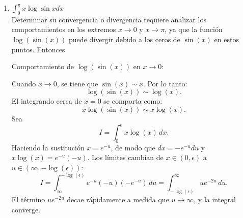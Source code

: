 \documentclass{article}
\begin{document}
\begin{enumerate}
\begin{enumerate}
Cuando \( x \to 0 \), el término \( \sin^2(x) \sim x^2 \) porque \( \sin(x) \approx x \). El denominador se aproxima a:
\[
1 + x^\beta x^2 = 1 + x^{\beta + 2}.
\]
Por lo tanto, el integrando tiene el siguiente comportamiento:
\[
\frac{x^\alpha}{1 + x^\beta \sin^2(x)} \sim \frac{x^\alpha}{1 + x^{\beta + 2}}.
\]
Para valores muy pequeños de \( x \), el término \( 1 + x^{\beta + 2} \sim 1 \), lo que lleva a:
\[
\frac{x^\alpha}{1 + x^{\beta + 2}} \sim x^\alpha.
\]
La integral en \( x \to 0 \) converge si \( \alpha > -1 \), ya que:
\[
\int_{0}^{\epsilon} x^\alpha \, dx = \frac{x^{\alpha + 1}}{\alpha + 1} \bigg|_0^\epsilon
\]
es finita si \( \alpha + 1 > 0 \).

Comportamiento en \( x \to \infty \):

Para \( x \to \infty \), el término \( x^\beta \sin^2(x) \) oscila entre \( 0 \) y \( x^\beta \), lo que implica que el denominador \( 1 + x^\beta \sin^2(x) \) oscila entre \( 1 \) y \( 1 + x^\beta \).

Estimación asintótica:

Cuando \( x \) es grande, aproximamos el integrando como:
\[
\frac{x^\alpha}{1 + x^\beta \sin^2(x)} \sim \frac{x^\alpha}{x^\beta}.
\]
Esto se reduce a:
\[
\frac{x^\alpha}{1 + x^\beta \sin^2(x)} \sim x^{\alpha - \beta}.
\]
La integral impropia:
\[
\int_{1}^{\infty} x^{\alpha - \beta} \, dx
\]
converge si \( \alpha - \beta < -1 \). En caso contrario, la integral diverge.

		\item $ \int_{0}^{\pi}x\log \sin x dx  $
\[\]       
Determinar su convergencia o divergencia requiere analizar los comportamientos en los extremos \( x \to 0 \) y \( x \to \pi \), ya que la función \( \log(\sin(x)) \) puede divergir debido a los ceros de \( \sin(x) \) en estos puntos. Entonces

Comportamiento de \( \log(\sin(x)) \) en \( x \to 0 \):

Cuando \( x \to 0 \), se tiene que \( \sin(x) \sim x \). Por lo tanto:
\[
\log(\sin(x)) \sim \log(x).
\]
El integrando cerca de \( x = 0 \) se comporta como:
\[
x \log(\sin(x)) \sim x \log(x).
\]
Sea 
\[
I = \int_0^\epsilon x \log(x) \, dx.
\]
Haciendo la sustitución \( x = e^{-u} \), de modo que \( dx = -e^{-u} du \) y \( x \log(x) = e^{-u} (-u) \). Los límites cambian de \( x \in (0, \epsilon) \) a \( u \in (\infty, -\log(\epsilon)) \):
\[
I = \int_{\infty}^{-\log(\epsilon)} e^{-u} (-u) (-e^{-u}) \, du = \int_{-\log(\epsilon)}^\infty u e^{-2u} \, du.
\]
El término \( u e^{-2u} \) decae rápidamente a medida que \( u \to \infty \), y la integral converge.


\end{enumerate}
\end{enumerate}
\end{document}
